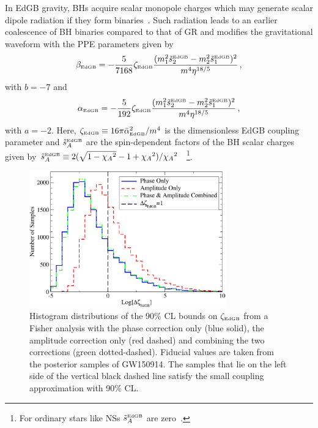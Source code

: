\documentclass[prd,twocolumn,nofootinbib]{revtex4-1}
\newcommand{\EDGB}{{\mbox{\tiny EdGB}}}
\begin{document}
In EdGB gravity, BHs acquire scalar monopole charges which may generate scalar dipole radiation if they form binaries~\cite{Yagi:2011xp,Sotiriou:2014pfa,Berti:2018cxi,Prabhu:2018aun}. Such radiation leads to an earlier coalescence of BH binaries compared to that of GR and modifies the gravitational waveform with the PPE parameters given by~\cite{Yunes:2016jcc,Yagi:2011xp}
\begin{equation}
 \beta_\EDGB=-\frac{5}{7168}\zeta_\EDGB\frac{(m_1^2\tilde s_2^\EDGB-m_2^2\tilde s_1^\EDGB)^2}{m^4\eta^{18/5}}\,,
 \end{equation}
 with $b=-7$ and 
  \begin{equation}
 \alpha_\EDGB=-\frac{5}{192}\zeta_\EDGB\frac{(m_1^2 \tilde s_2^\EDGB-m_2^2 \tilde s_1^\EDGB)^2}{m^4\eta^{18/5}}\,,
 \end{equation}
 with $a=-2$.  Here, $\zeta_\EDGB\equiv 16 \pi \bar{\alpha}_\EDGB^2/m^4$ is the dimensionless EdGB coupling parameter and $\tilde s_{A}^\EDGB$ are the spin-dependent factors of the BH scalar charges given by $\tilde s_{A}^\EDGB\equiv 2(\sqrt{1-{\chi_A}^2}-1+{\chi_A}^2)/{\chi_A}^2~$~\cite{Berti:2018cxi,Prabhu:2018aun}\footnote{For ordinary stars like NSs $\tilde s_A^\EDGB$ are zero~\cite{Yagi:2011xp,Yagi:2015oca}.}.

\begin{figure}[htb]
\includegraphics[width=8.5cm]{histogram-gw150914.pdf}
\caption{Histogram distributions of the 90\% CL bounds on $\zeta_{\EDGB}$ from a Fisher analysis with the phase correction only (blue solid), the amplitude correction only (red dashed) and combining the two corrections (green dotted-dashed). Fiducial values are taken from the posterior samples of GW150914. The samples that lie on the left side of the vertical black dashed line satisfy the small coupling approximation with 90\% CL.}
\label{fig:histogram-edgb}
\end{figure}
\end{document}
